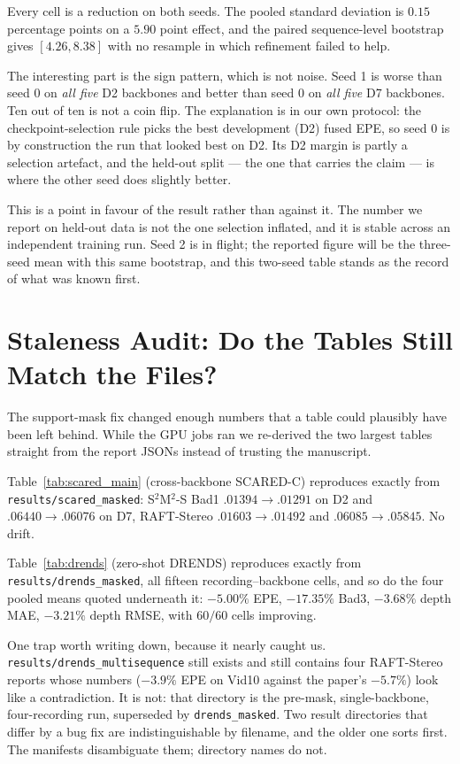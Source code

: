 \documentclass[11pt,a4paper]{article}
\begin{document}
Every cell is a reduction on both seeds. The pooled standard deviation is
$0.15$ percentage points on a $5.90$ point effect, and the paired
sequence-level bootstrap gives $[4.26, 8.38]$ with no resample in which
refinement failed to help.

The interesting part is the sign pattern, which is not noise. Seed 1 is
worse than seed 0 on \emph{all five} D2 backbones and better than seed 0 on
\emph{all five} D7 backbones. Ten out of ten is not a coin flip. The
explanation is in our own protocol: the checkpoint-selection rule picks the
best development (D2) fused EPE, so seed 0 is by construction the run that
looked best on D2. Its D2 margin is partly a selection artefact, and the
held-out split --- the one that carries the claim --- is where the other seed
does slightly better.

This is a point in favour of the result rather than against it. The number
we report on held-out data is not the one selection inflated, and it is
stable across an independent training run. Seed 2 is in flight; the reported
figure will be the three-seed mean with this same bootstrap, and this
two-seed table stands as the record of what was known first.



\section*{Staleness Audit: Do the Tables Still Match the Files?}

The support-mask fix changed enough numbers that a table could plausibly
have been left behind. While the GPU jobs ran we re-derived the two largest
tables straight from the report JSONs instead of trusting the manuscript.

Table~\ref{tab:scared_main} (cross-backbone SCARED-C) reproduces exactly
from \texttt{results/scared\_masked}: S$^2$M$^2$-S Bad1
$.01394\!\rightarrow\!.01291$ on D2 and $.06440\!\rightarrow\!.06076$ on D7,
RAFT-Stereo $.01603\!\rightarrow\!.01492$ and
$.06085\!\rightarrow\!.05845$. No drift.

Table~\ref{tab:drends} (zero-shot DRENDS) reproduces exactly from
\texttt{results/drends\_masked}, all fifteen recording--backbone cells, and
so do the four pooled means quoted underneath it: $-5.00\%$ EPE,
$-17.35\%$ Bad3, $-3.68\%$ depth MAE, $-3.21\%$ depth RMSE, with $60/60$
cells improving.

One trap worth writing down, because it nearly caught us.
\texttt{results/drends\_multisequence} still exists and still contains four
RAFT-Stereo reports whose numbers ($-3.9\%$ EPE on Vid10 against the
paper's $-5.7\%$) look like a contradiction. It is not: that directory is
the pre-mask, single-backbone, four-recording run, superseded by
\texttt{drends\_masked}. Two result directories that differ by a bug fix are
indistinguishable by filename, and the older one sorts first. The manifests
disambiguate them; directory names do not.
\end{document}
